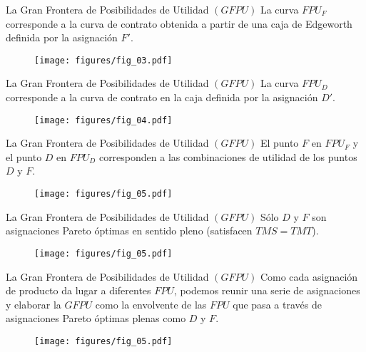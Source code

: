 \begin{frame}{La Gran Frontera de Posibilidades de Utilidad $(GFPU)$}
La curva $FPU_F$ corresponde a la curva de contrato obtenida a partir de una caja de Edgeworth definida por la asignación $F'$.
	\begin{figure}[h]
		\centering
		\texttt{[image: figures/fig\_03.pdf]}
	\end{figure}
\end{frame}
\begin{frame}{La Gran Frontera de Posibilidades de Utilidad $(GFPU)$}
La curva $FPU_D$ corresponde a la curva de contrato en la caja definida por la asignación $D'$.
	\begin{figure}[h]
		\centering
		\texttt{[image: figures/fig\_04.pdf]}
	\end{figure}
\end{frame}
\begin{frame}{La Gran Frontera de Posibilidades de Utilidad $(GFPU)$}
El punto $F$ en $FPU_F$ y el punto $D$ en $FPU_D$ corresponden a las combinaciones de utilidad de los puntos $D$ y $F$.
	\begin{figure}[h]
		\centering
		\texttt{[image: figures/fig\_05.pdf]}
	\end{figure}
\end{frame}
\begin{frame}{La Gran Frontera de Posibilidades de Utilidad $(GFPU)$}
Sólo $D$ y $F$ son asignaciones Pareto óptimas en sentido pleno (satisfacen $TMS=TMT$).
	\begin{figure}[h]
		\centering
		\texttt{[image: figures/fig\_05.pdf]}
	\end{figure}
\end{frame}
\begin{frame}{La Gran Frontera de Posibilidades de Utilidad $(GFPU)$}
Como cada asignación de producto da lugar a diferentes $FPU$, podemos reunir una serie de asignaciones y elaborar la $GFPU$ como la envolvente de las $FPU$ que pasa a través de asignaciones Pareto óptimas plenas como $D$ y $F$.
	\begin{figure}[h]
		\centering
		\texttt{[image: figures/fig\_05.pdf]}
	\end{figure}
\end{frame}
